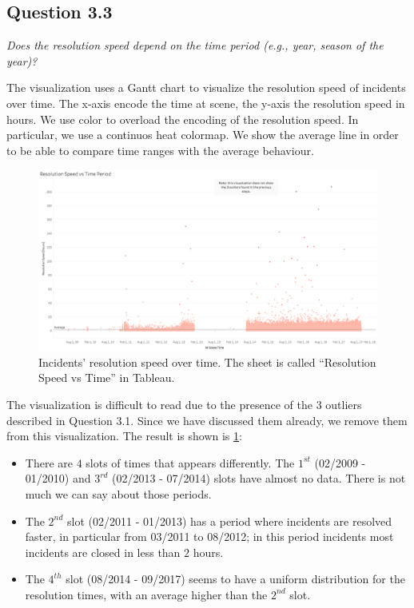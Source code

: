 \subsection*{Question 3.3}
\textit{Does the resolution speed depend on the time period (e.g., year, season of the year)?}

The visualization uses a Gantt chart to visualize the resolution speed of incidents over time.
The x-axis encode the time at scene, the y-axis the resolution speed in hours.
We use color to overload the encoding of the resolution speed.
In particular, we use a continuos heat colormap.
We show the average line in order to be able to compare time ranges with the average behaviour.

\begin{figure}[h]
	\centering
	\includegraphics[width=\columnwidth]{figures/3_3_resolution_speed_vs_time}
	\caption{Incidents' resolution speed over time. The sheet is called ``Resolution Speed vs Time'' in Tableau.}
	\label{fig:3_3_resolution_speed_vs_time}
\end{figure}

The visualization is difficult to read due to the presence of the $3$ outliers described in Question 3.1.
Since we have discussed them already, we remove them from this visualization.
The result is shown is \cref{fig:3_3_resolution_speed_vs_time}:
\begin{itemize}
    \item There are $4$ slots of times that appears differently. The $1^{st}$ (02/2009 - 01/2010) and $3^{rd}$ (02/2013 - 07/2014) slots have almost no data. There is not much we can say about those periods.
    \item The $2^{nd}$ slot (02/2011 - 01/2013) has a period where incidents are resolved faster, in particular from 03/2011 to 08/2012; in this period incidents most incidents are closed in less than $2$ hours.
    \item The $4^{th}$ slot (08/2014 - 09/2017) seems to have a uniform distribution for the resolution times, with an average higher than the $2^{nd}$ slot.
\end{itemize}

